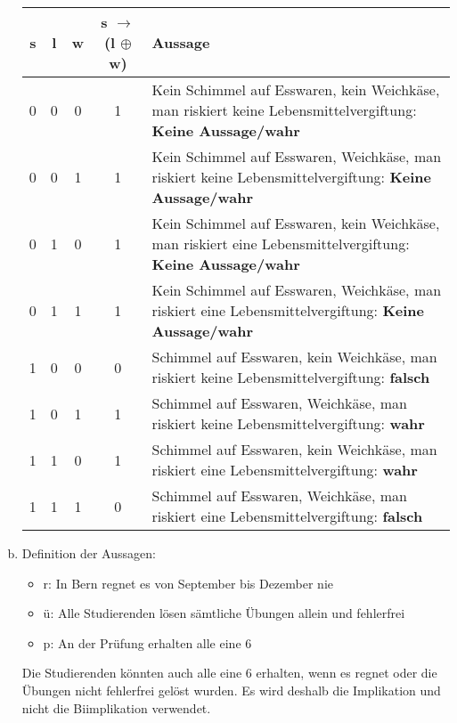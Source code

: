 \documentclass[12pt,a4paper]{article}
\begin{document}
\begin{enumerate}[a)]
\begin{tabular}{c|c|c|c|p{}}
s & l & w & s $\rightarrow$ (l $\oplus$ w) & Aussage\\
\hline
0 & 0 & 0 & 1 & Kein Schimmel auf Esswaren, kein Weichkäse, man riskiert keine Lebensmittelvergiftung: \textbf{Keine Aussage/wahr}\\
\hline
0 & 0 & 1 & 1 & Kein Schimmel auf Esswaren, Weichkäse, man riskiert keine Lebensmittelvergiftung: \textbf{Keine Aussage/wahr}\\
\hline
0 & 1 & 0 & 1 & Kein Schimmel auf Esswaren, kein Weichkäse, man riskiert eine Lebensmittelvergiftung: \textbf{Keine Aussage/wahr}\\
\hline
0 & 1 & 1 & 1 & Kein Schimmel auf Esswaren, Weichkäse, man riskiert eine Lebensmittelvergiftung: \textbf{Keine Aussage/wahr}\\
\hline
1 & 0 & 0 & 0 & Schimmel auf Esswaren, kein Weichkäse, man riskiert keine Lebensmittelvergiftung: \textbf{falsch}\\
\hline
1 & 0 & 1 & 1 & Schimmel auf Esswaren, Weichkäse, man riskiert keine Lebensmittelvergiftung: \textbf{wahr}\\
\hline
1 & 1 & 0 & 1 & Schimmel auf Esswaren, kein Weichkäse, man riskiert eine Lebensmittelvergiftung: \textbf{wahr}\\
\hline
1 & 1 & 1 & 0 & Schimmel auf Esswaren, Weichkäse, man riskiert eine Lebensmittelvergiftung: \textbf{falsch}\\
\end{tabular}

\item Definition der Aussagen:
\begin{itemize}
\item r: In Bern regnet es von September bis Dezember nie
\item ü: Alle Studierenden lösen sämtliche Übungen allein und fehlerfrei
\item p: An der Prüfung erhalten alle eine 6
\end{itemize}
Die Studierenden könnten auch alle eine 6 erhalten, wenn es regnet oder die Übungen nicht fehlerfrei gelöst wurden. Es wird deshalb die Implikation und nicht die Biimplikation verwendet.


\end{enumerate}
\end{document}
